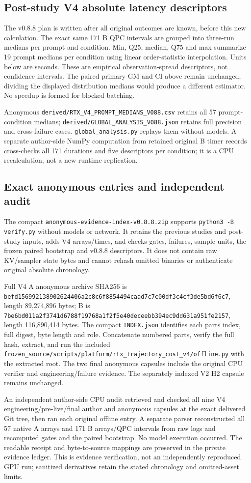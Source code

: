 \subsection{Post-study V4 absolute latency descriptors}
The v0.8.8 plan is written after all original outcomes are known, before this new calculation. The exact same 171 B QPC intervals are grouped into three-run medians per prompt and condition. Min, Q25, median, Q75 and max summarize 19 prompt medians per condition using linear order-statistic interpolation. Units below are seconds. These are empirical observation-spread descriptors, not confidence intervals. The paired primary GM and CI above remain unchanged; dividing the displayed distribution medians would produce a different estimator. No speedup is formed for blocked batching.

Anonymous \nolinkurl{derived/RTX_V4_PROMPT_MEDIANS_V088.csv} retains all 57 prompt-condition medians; \nolinkurl{derived/GLOBAL_ANALYSIS_V088.json} retains full precision and cross-failure cases. \nolinkurl{global_analysis.py} replays them without models. A separate author-side NumPy computation from retained original B timer records cross-checks all 171 durations and five descriptors per condition; it is a CPU recalculation, not a new runtime replication.

\subsection{Exact anonymous entries and independent audit}
The compact \nolinkurl{anonymous-evidence-index-v0.8.8.zip} supports \texttt{python3 -B verify.py} without models or network. It retains the previous studies and post-study inputs, adds V4 arrays/times, and checks gates, failures, sample units, the frozen paired bootstrap and v0.8.8 descriptors. It does not contain raw KV/sampler state bytes and cannot rehash omitted binaries or authenticate original absolute chronology.

Full V4 A anonymous archive SHA256 is \nolinkurl{befd156992138902624406a2c8c6f8854494caad7c7c00df3c4cf3de5bd6f6c7}, length 89,274,896 bytes; B is \nolinkurl{7be6bd011a2f3741d6788f19768a1f2f5e40deceebb394ec9dd631a951fe2157}, length 116,890,414 bytes. The compact \texttt{INDEX.json} identifies each parts index, full digest, byte length and role. Concatenate numbered parts, verify the full hash, extract, and run the included \nolinkurl{frozen_source/scripts/platform/rtx_trajectory_cost_v4/offline.py} with the extracted root. The two final anonymous capsules include the original CPU verifier and engineering/failure evidence. The separately indexed V2 H2 capsule remains unchanged.

An independent author-side CPU audit retrieved and checked all nine V4 engineering/pre-live/final author and anonymous capsules at the exact delivered Git tree, then ran each original offline entry. A separate parser reconstructed all 57 native A arrays and 171 B arrays/QPC intervals from raw logs and recomputed gates and the paired bootstrap. No model execution occurred. The readable receipt and byte-to-source mappings are preserved in the private evidence ledger. This is evidence verification, not an independently reproduced GPU run; sanitized derivatives retain the stated chronology and omitted-asset limits.
